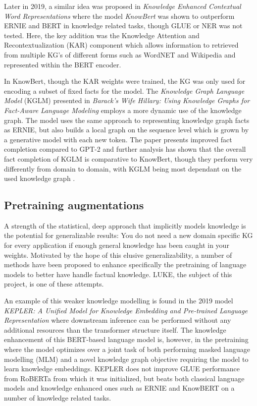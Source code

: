 \documentclass[main.tex]{subfiles}
\begin{document}
Later in 2019, a similar idea was proposed in \emph{Knowledge Enhanced Contextual Word Representations} where the model \emph{KnowBert} \cite{peters2019knowbert} was shown to outperform ERNIE and BERT in knowledge related tasks, though GLUE or NER was not tested.
Here, the key addition was the Knowledge Attention and Recontextualization (KAR) component which allows information to retrieved from multiple KG's of different forms such as WordNET and Wikipedia and represented within the BERT encoder.

In KnowBert, though the KAR weights were trained, the KG was only used for encoding a subset of fixed facts for the model.
The \emph{Knowledge Graph Language Model} (KGLM) presented in \emph{Barack’s Wife Hillary: Using Knowledge Graphs for Fact-Aware Language Modeling} \cite{logan2019barack} employs a more dynamic use of the knowledge graph.
The model uses the same approach to representing knowledge graph facts as ERNIE, but also builds a local graph on the sequence level which is grown by a generative model with each new token.
The paper presents improved fact completion compared to GPT-2 and further analysis has shown that the overall fact completion of KGLM is comparative to KnowBert, though they perform very differently from domain to domain, with KGLM being most dependant on the used knowledge graph \cite{birk2020knowledge}.

\subsection{Pretraining augmentations}
A strength of the statistical, deep approach that implicitly models knowledge is the potential for generalizable results:
You do not need a new domain specific KG for every application if enough general knowledge has been caught in your weights.
Motivated by the hope of this elusive generalizability, a number of methods have been proposed to enhance specifically the pretraining of language models to better have handle factual knowledge.
LUKE, the subject of this project, is one of these attempts.

An example of this weaker knowledge modelling is found in the 2019 model \emph{KEPLER: A Unified Model for Knowledge Embedding and Pre-trained Language Representation} \cite{wang2021kepler} where downstream inference can be performed without any additional resources than the transformer structure itself.
The knowledge enhancement of this BERT-based language model is, however, in the pretraining where the model optimizes over a joint task of both performing masked language modelling (MLM) and a novel knowledge graph objective requiring the model to learn knowledge embeddings.
KEPLER does not improve GLUE performance from RoBERTa \cite{liu2019roberta} from which it was initialized, but beats both classical language models and knowledge enhanced ones such as ERNIE and KnowBERT on a number of knowledge related tasks.
\end{document}
